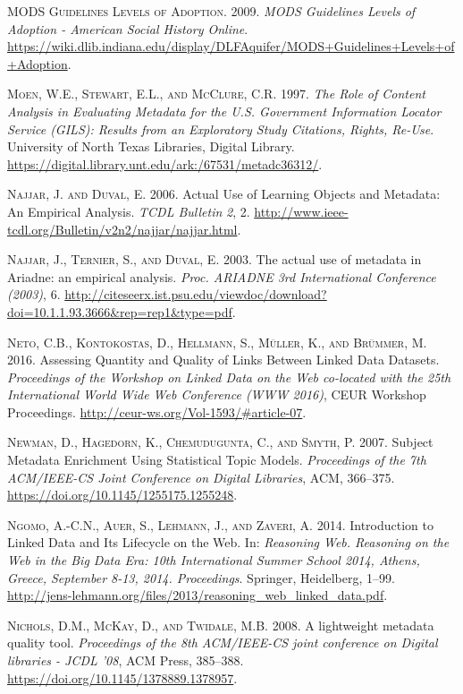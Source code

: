 \textsc{MODS Guidelines Levels of Adoption}. 2009. \emph{MODS Guidelines Levels of Adoption - American Social History Online}. \url{https://wiki.dlib.indiana.edu/display/DLFAquifer/MODS+Guidelines+Levels+of+Adoption}.

\textsc{Moen, W.E., Stewart, E.L., and McClure, C.R.} 1997. \emph{The Role of Content Analysis in Evaluating Metadata for the U.S. Government Information Locator Service (GILS): Results from an Exploratory Study Citations, Rights, Re-Use}. University of North Texas Libraries, Digital Library. \url{https://digital.library.unt.edu/ark:/67531/metadc36312/}.

\textsc{Najjar, J. and Duval, E.} 2006. Actual Use of Learning Objects and Metadata: An Empirical Analysis. \emph{TCDL Bulletin} \emph{2}, 2. \url{http://www.ieee-tcdl.org/Bulletin/v2n2/najjar/najjar.html}.

\textsc{Najjar, J., Ternier, S., and Duval, E.} 2003. The actual use of metadata in Ariadne: an empirical analysis. \emph{Proc. ARIADNE 3rd International Conference (2003)}, 6. \url{http://citeseerx.ist.psu.edu/viewdoc/download?doi=10.1.1.93.3666\&rep=rep1\&type=pdf}.

\textsc{Neto, C.B., Kontokostas, D., Hellmann, S., Müller, K., and Brümmer, M.} 2016. Assessing Quantity and Quality of Links Between Linked Data Datasets. \emph{Proceedings of the Workshop on Linked Data on the Web co-located with the 25th International World Wide Web Conference (WWW 2016)}, CEUR Workshop Proceedings. \url{http://ceur-ws.org/Vol-1593/#article-07}.

\textsc{Newman, D., Hagedorn, K., Chemudugunta, C., and Smyth, P.} 2007. Subject Metadata Enrichment Using Statistical Topic Models. \emph{Proceedings of the 7th ACM/IEEE-CS Joint Conference on Digital Libraries}, ACM, 366–375. \url{https://doi.org/10.1145/1255175.1255248}.

\textsc{Ngomo, A.-C.N., Auer, S., Lehmann, J., and Zaveri, A.} 2014. Introduction to Linked Data and Its Lifecycle on the Web. In: \emph{Reasoning Web. Reasoning on the Web in the Big Data Era: 10th International Summer School 2014, Athens, Greece, September 8-13, 2014. Proceedings}. Springer, Heidelberg, 1–99. \url{http://jens-lehmann.org/files/2013/reasoning_web_linked_data.pdf}.

\textsc{Nichols, D.M., McKay, D., and Twidale, M.B.} 2008. A lightweight metadata quality tool. \emph{Proceedings of the 8th ACM/IEEE-CS joint conference on Digital libraries - JCDL ’08}, ACM Press, 385–388. \url{https://doi.org/10.1145/1378889.1378957}.

